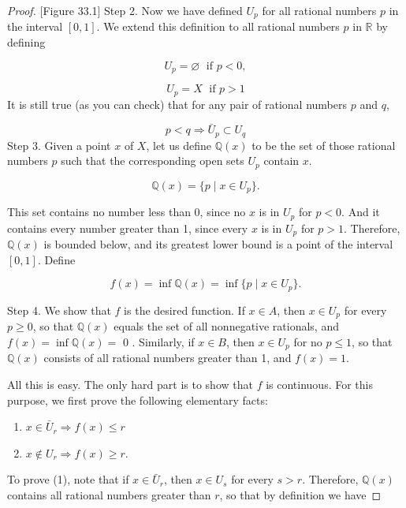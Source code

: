 \begin{proof}
[Figure 33.1]
Step 2. Now we have defined \(U_{p}\) for all rational numbers \(p\) in the interval \([ {0,1}]\). We extend this definition to all rational numbers \(p\) in \(\mathbb{R}\) by defining

\[
U_{p} = \varnothing \;\text{ if }p < 0,
\]

\[
U_{p} = X\;\text{ if }p > 1
\]
It is still true (as you can check) that for any pair of rational numbers \(p\) and \(q\),

\[
p < q \Rightarrow {\bar{U}}_{p} \subset {U}_{q}
\]
Step 3. Given a point \(x\) of \(X\), let us define \(\mathbb{Q}(x)\) to be the set of those rational numbers \(p\) such that the corresponding open sets \(U_{p}\) contain \(x\).

\[
\mathbb{Q}(x) = \{ {p \mid x \in {U}_{p}}\}.
\]

This set contains no number less than 0, since no \(x\) is in \(U_{p}\) for \(p < 0\). And it contains every number greater than 1, since every \(x\) is in \(U_{p}\) for \(p > 1\). Therefore, \(\mathbb{Q}(x)\) is bounded below, and its greatest lower bound is a point of the interval \([ {0,1}]\). Define

\[
f(x) = \inf \mathbb{Q}(x) = \inf \{ {p \mid x \in {U}_{p}}\}.
\]

Step 4. We show that \(f\) is the desired function. If \(x \in A\), then \(x \in {U}_{p}\) for every \(p \geq 0\), so that \(\mathbb{Q}(x)\) equals the set of all nonnegative rationals, and \(f(x) = \inf \mathbb{Q}(x) =\) 0 . Similarly, if \(x \in B\), then \(x \in {U}_{p}\) for no \(p \leq 1\), so that \(\mathbb{Q}(x)\) consists of all rational numbers greater than 1, and \(f(x) = 1\).

All this is easy. The only hard part is to show that \(f\) is continuous. For this purpose, we first prove the following elementary facts:

\begin{enumerate}[itemsep=0.2em, parsep=0pt, topsep=0pt, partopsep=0pt, leftmargin=*, label=(\arabic*), align=left]
\item \(x \in {\bar{U}}_{r} \Rightarrow f(x) \leq r\)
\item \(x \notin {U}_{r} \Rightarrow f(x) \geq r\).
\end{enumerate}

To prove (1), note that if \(x \in {\bar{U}}_{r}\), then \(x \in {U}_{s}\) for every \(s > r\). Therefore, \(\mathbb{Q}(x)\) contains all rational numbers greater than \(r\), so that by definition we have


\end{proof}
